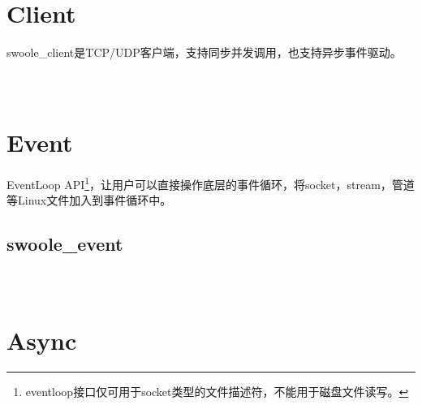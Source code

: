 \chapter{Client}

swoole\_client是TCP/UDP客户端，支持同步并发调用，也支持异步事件驱动。


\begin{lstlisting}[language=bash]

\end{lstlisting}




\begin{lstlisting}[language=bash]

\end{lstlisting}




\begin{lstlisting}[language=bash]

\end{lstlisting}


\chapter{Event}

EventLoop API\footnote{eventloop接口仅可用于socket类型的文件描述符，不能用于磁盘文件读写。}，让用户可以直接操作底层的事件循环，将socket，stream，管道等Linux文件加入到事件循环中。


\section{swoole\_event}



\begin{lstlisting}[language=bash]

\end{lstlisting}




\begin{lstlisting}[language=bash]

\end{lstlisting}




\begin{lstlisting}[language=bash]

\end{lstlisting}


\chapter{Async}




